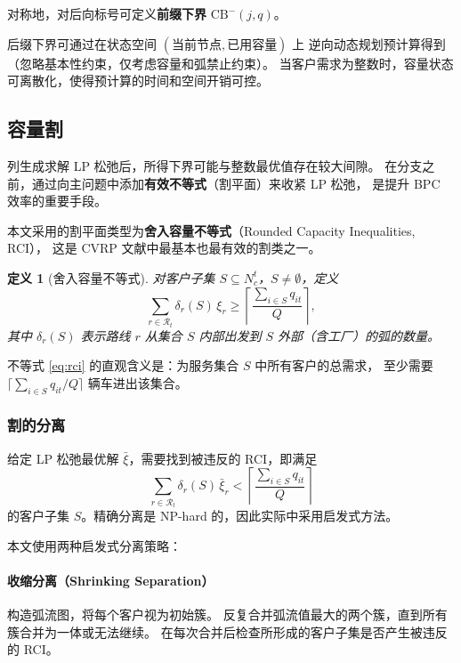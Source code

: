 \documentclass{article}
\newtheorem{definition}{定义}
\begin{document}
对称地，对后向标号可定义\textbf{前缀下界} $\text{CB}^-(j, q)$。

后缀下界可通过在状态空间 $(\text{当前节点}, \text{已用容量})$ 上
逆向动态规划预计算得到（忽略基本性约束，仅考虑容量和弧禁止约束）。
当客户需求为整数时，容量状态可离散化，使得预计算的时间和空间开销可控。

\subsection{容量割}
\label{sec:capacity_cuts}

列生成求解 LP 松弛后，所得下界可能与整数最优值存在较大间隙。
在分支之前，通过向主问题中添加\textbf{有效不等式}（割平面）来收紧 LP 松弛，
是提升 BPC 效率的重要手段。

本文采用的割平面类型为\textbf{舍入容量不等式}（Rounded Capacity Inequalities, RCI），
这是 CVRP 文献中最基本也最有效的割类之一。

\begin{definition}[舍入容量不等式]
对客户子集 $S \subseteq N_c^t$，$S \ne \emptyset$，定义
\begin{equation}
\sum_{r \in \mathcal{R}_t} \delta_r(S)\,\xi_r \ge \left\lceil \frac{\sum_{i \in S} q_{it}}{Q} \right\rceil,
\label{eq:rci}
\end{equation}
其中 $\delta_r(S)$ 表示路线 $r$ 从集合 $S$ 内部出发到 $S$ 外部（含工厂）的弧的数量。
\end{definition}

不等式 \eqref{eq:rci} 的直观含义是：为服务集合 $S$ 中所有客户的总需求，
至少需要 $\lceil \sum_{i \in S} q_{it} / Q \rceil$ 辆车进出该集合。

\subsubsection{割的分离}

给定 LP 松弛最优解 $\bar\xi$，需要找到被违反的 RCI，即满足
\begin{equation}
\sum_{r \in \mathcal{R}_t} \delta_r(S)\,\bar\xi_r < \left\lceil \frac{\sum_{i \in S} q_{it}}{Q} \right\rceil
\end{equation}
的客户子集 $S$。精确分离是 NP-hard 的，因此实际中采用启发式方法。

本文使用两种启发式分离策略：

\paragraph{收缩分离（Shrinking Separation）}
构造弧流图，将每个客户视为初始簇。
反复合并弧流值最大的两个簇，直到所有簇合并为一体或无法继续。
在每次合并后检查所形成的客户子集是否产生被违反的 RCI。
\end{document}
